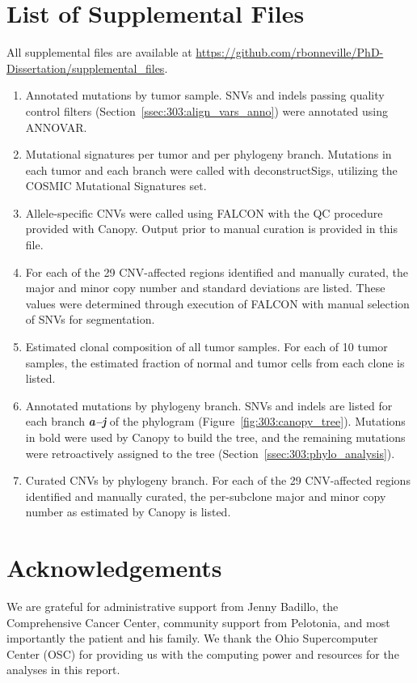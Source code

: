 \section{List of Supplemental Files}
All supplemental files are available at \url{https://github.com/rbonneville/PhD-Dissertation/supplemental_files}.
\begin{enumerate}
    \renewcommand*{\labelenumi}{S\thechapter{}.\arabic{enumi}. }
    \item Annotated mutations by tumor sample. SNVs and indels passing quality control filters (Section~\ref{ssec:303:align_vars_anno}) were annotated using ANNOVAR.
    \item Mutational signatures per tumor and per phylogeny branch. Mutations in each tumor and each branch were called with deconstructSigs, utilizing the COSMIC Mutational Signatures set.
    \item Allele-specific CNVs were called using FALCON with the QC procedure provided with Canopy. Output prior to manual curation is provided in this file.
    \item For each of the 29 CNV-affected regions identified and manually curated, the major and minor copy number and standard deviations are listed. These values were determined through execution of FALCON with manual selection of SNVs for segmentation.
    \item Estimated clonal composition of all tumor samples. For each of 10 tumor samples, the estimated fraction of normal and tumor cells from each clone is listed.
    \item Annotated mutations by phylogeny branch. SNVs and indels are listed for each branch \textbf{\textit{a--j}} of the phylogram (Figure~\ref{fig:303:canopy_tree}). Mutations in bold were used by Canopy to build the tree, and the remaining mutations were retroactively assigned to the tree (Section~\ref{ssec:303:phylo_analysis}).
    \item Curated CNVs by phylogeny branch. For each of the 29 CNV-affected regions identified and manually curated, the per-subclone major and minor copy number as estimated by Canopy is listed.
\end{enumerate}

\section*{Acknowledgements}
We are grateful for administrative support from Jenny Badillo, the Comprehensive Cancer Center, community support from Pelotonia, and most importantly the patient and his family. We thank the Ohio Supercomputer Center (OSC) for providing us with the computing power and resources for the analyses in this report.
